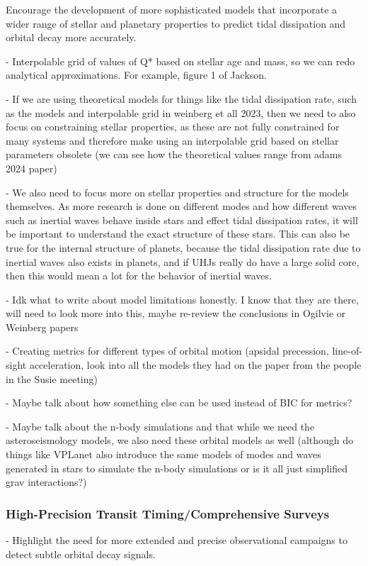 \documentclass[oneside,12pt]{amsart}
\numberwithin{page}{section}
\begin{document}
Encourage the development of more sophisticated models that incorporate a wider range of stellar and planetary properties to predict tidal dissipation and orbital decay more accurately.

- Interpolable grid of values of Q* based on stellar age and mass, so we can redo analytical approximations. For example, figure 1 of Jackson. 

- If we are using theoretical models for things like the tidal dissipation rate, such as the models and interpolable grid in weinberg et all 2023, then we need to also focus on constraining stellar properties, as these are not fully constrained for many systems and therefore make using an interpolable grid based on stellar parameters obsolete (we can see how the theoretical values range from adams 2024 paper)

- We also need to focus more on stellar properties and structure for the models themselves. As more research is done on different modes and how different waves such as inertial waves behave inside stars and effect tidal dissipation rates, it will be important to understand the exact structure of these stars. This can also be true for the internal structure of planets, because the tidal dissipation rate due to inertial waves also exists in planets, and if UHJs really do have a large solid core, then this would mean a lot for the behavior of inertial waves. 

- Idk what to write about model limitations honestly. I know that they are there, will need to look more into this, maybe re-review the conclusions in Ogilvie or Weinberg papers

- Creating metrics for different types of orbital motion (apsidal precession, line-of-sight acceleration, look into all the models they had on the paper from the people in the Susie meeting)

- Maybe talk about how something else can be used instead of BIC for metrics?

- Maybe talk about the n-body simulations and that while we need the asteroseismology models, we also need these orbital models as well (although do things like VPLanet also introduce the same models of modes and waves generated in stars to simulate the n-body simulations or is it all just simplified grav interactions?)

\subsubsection{High-Precision Transit Timing/Comprehensive Surveys}
- Highlight the need for more extended and precise observational campaigns to detect subtle orbital decay signals.
\end{document}
